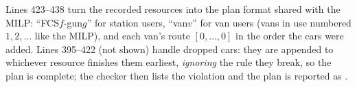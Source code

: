 
Lines 423--438 turn the recorded resources into the plan format shared with the MILP: ``FCS$f$-gun$g$'' for station users, ``van$v$'' for van users (vans in use numbered $1,2,\dots$ like the MILP), and each van's route $[0,\dots,0]$ in the order the cars were added. Lines 395--422 (not shown) handle dropped cars: they are appended to whichever resource finishes them earliest, \emph{ignoring} the rule they break, so the plan is complete; the checker then lists the violation and the plan is reported as .

